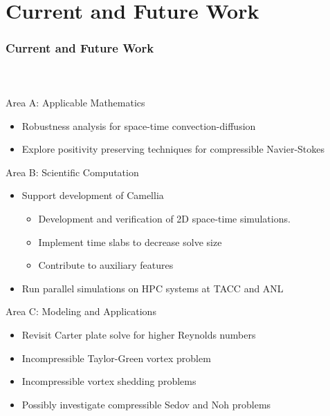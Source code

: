 \documentclass[18pt,xcolor=table]{beamer}
\begin{document}
\section{Current and Future Work}
\begin{frame}[t]
\frametitle{Current and Future Work}
\framesubtitle{~~}  %
\vspace{-3ex}
Area A: Applicable Mathematics
\begin{itemize}
  \item Robustness analysis for space-time convection-diffusion
  \item Explore positivity preserving techniques for compressible Navier-Stokes
\end{itemize}
\smallskip

Area B: Scientific Computation
\begin{itemize}
  \item Support development of Camellia
  \begin{itemize}
    \item Development and verification of 2D space-time simulations.
    \item Implement time slabs to decrease solve size
    \item Contribute to auxiliary features
  \end{itemize}
  \item Run parallel simulations on HPC systems at TACC and ANL
\end{itemize}
\smallskip

Area C: Modeling and Applications
\begin{itemize}
  \item Revisit Carter plate solve for higher Reynolds numbers
  \item Incompressible Taylor-Green vortex problem
  \item Incompressible vortex shedding problems
  \item Possibly investigate compressible Sedov and Noh problems
\end{itemize}
\end{frame}
\end{document}
